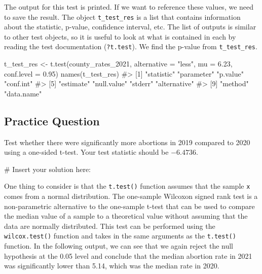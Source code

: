 \documentclass[
  letterpaper,
]{latex/krantz}
\makeatletter
\newenvironment{Shaded}{\begin{snugshade}}{\end{snugshade}}
\newcommand{\AttributeTok}[1]{\textcolor[rgb]{0.40,0.45,0.13}{#1}}
\newcommand{\CommentTok}[1]{\textcolor[rgb]{0.37,0.37,0.37}{#1}}
\newcommand{\FloatTok}[1]{\textcolor[rgb]{0.68,0.00,0.00}{#1}}
\newcommand{\FunctionTok}[1]{\textcolor[rgb]{0.28,0.35,0.67}{#1}}
\newcommand{\NormalTok}[1]{\textcolor[rgb]{0.00,0.23,0.31}{#1}}
\newcommand{\OtherTok}[1]{\textcolor[rgb]{0.00,0.23,0.31}{#1}}
\newcommand{\SpecialCharTok}[1]{\textcolor[rgb]{0.37,0.37,0.37}{#1}}
\newcommand{\StringTok}[1]{\textcolor[rgb]{0.13,0.47,0.30}{#1}}
\newenvironment{kframe}{%
\medskip{}
\setlength{\fboxsep}{.8em}
 \def\at@end@of@kframe{}%
 \ifinner\ifhmode%
  \def\at@end@of@kframe{\end{minipage}}%
  \begin{minipage}{\columnwidth}%
 \fi\fi%
 \def\FrameCommand##1{\hskip\@totalleftmargin \hskip-\fboxsep
 \colorbox{shadecolor}{##1}\hskip-\fboxsep
     \hskip-\linewidth \hskip-\@totalleftmargin \hskip\columnwidth}%
 \MakeFramed {\advance\hsize-\width
   \@totalleftmargin\z@ \linewidth\hsize
   \@setminipage}}%
 {\par\unskip\endMakeFramed%
 \at@end@of@kframe}
\renewenvironment{Shaded}{\begin{kframe}}{\end{kframe}}
\makeatother
\begin{document}
The output for this test is printed. If we want to reference these
values, we need to save the result. The object \texttt{t\_test\_res} is
a list that contains information about the statistic, p-value,
confidence interval, etc. The list of outputs is similar to other test
objects, so it is useful to look at what is contained in each by reading
the test documentation (\texttt{?t.test}). We find the p-value from
\texttt{t\_test\_res}.

\begin{Shaded}
\begin{Highlighting}[]
\NormalTok{t\_test\_res }\OtherTok{\textless{}{-}} \FunctionTok{t.test}\NormalTok{(county\_rates\_2021, }\AttributeTok{alternative =} \StringTok{"less"}\NormalTok{, }
                     \AttributeTok{mu =} \FloatTok{6.23}\NormalTok{, }\AttributeTok{conf.level =} \FloatTok{0.95}\NormalTok{)}
\FunctionTok{names}\NormalTok{(t\_test\_res)}
\CommentTok{\#\textgreater{}  [1] "statistic"   "parameter"   "p.value"     "conf.int"   }
\CommentTok{\#\textgreater{}  [5] "estimate"    "null.value"  "stderr"      "alternative"}
\CommentTok{\#\textgreater{}  [9] "method"      "data.name"}
\end{Highlighting}
\end{Shaded}

\begin{Shaded}
\end{Shaded}

\subsection{Practice Question}\label{practice-question-17}

Test whether there were significantly more abortions in 2019 compared to
2020 using a one-sided t-test. Your test statistic should be
\(-6.4736\).

\begin{Shaded}
\begin{Highlighting}[]
\CommentTok{\# Insert your solution here:}
\end{Highlighting}
\end{Shaded}

One thing to consider is that the \texttt{t.test()} function assumes
that the sample \texttt{x} comes from a normal distribution. The
one-sample Wilcoxon signed rank test is a non-parametric alternative to
the one-sample t-test that can be used to compare the median value of a
sample to a theoretical value without assuming that the data are
normally distributed. This test can be performed using the
\texttt{wilcox.test()}
function and takes in the same arguments as the \texttt{t.test()}
function. In the following output, we can see that we again reject the
null hypothesis at the 0.05 level and conclude that the median abortion
rate in 2021 was significantly lower than 5.14, which was the median
rate in 2020.
\end{document}
